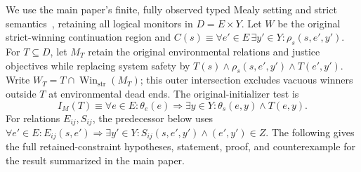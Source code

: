 We use the main paper's finite, fully observed typed Mealy setting and
strict semantics~\cite{gr1,kind}, retaining all logical monitors in
$D=E\times Y$. Let $W$ be the original strict-winning continuation region
and $C(s)\equiv\forall e'\in E\,\exists y'\in Y:\rho_s(s,e',y')$.
For $T\subseteq D$, let $M_T$ retain the original environmental relations
and justice objectives while replacing system safety by
$T(s)\land\rho_s(s,e',y')\land T(e',y')$.
Write $W_T=T\cap\operatorname{Win}_{\mathrm{str}}(M_T)$; this outer
intersection excludes vacuous winners outside $T$ at environmental dead ends.
The original-initializer test is
\[
I_M(T)\equiv\forall e\in E:\theta_e(e)\Rightarrow
\exists y\in Y:\theta_s(e,y)\land T(e,y).
\]
For relations $E_{ij},S_{ij}$, the predecessor below uses
$\forall e'\in E:E_{ij}(s,e')\Rightarrow
\exists y'\in Y:S_{ij}(s,e',y')\land(e',y')\in Z$.
The following gives the full retained-constraint hypotheses, statement,
proof, and counterexample for the result summarized in the main paper.

